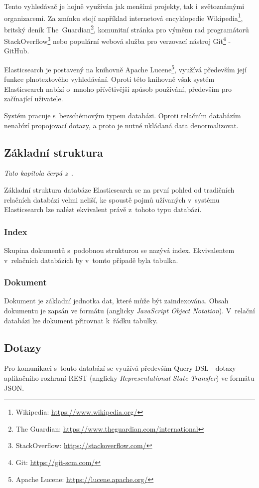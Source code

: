 Tento vyhledávač je hojně využíván jak menšími projekty, tak i~světoznámými organizacemi. Za zmínku stojí například internetová encyklopedie Wikipedia\footnote{Wikipedia: \url{https://www.wikipedia.org/}}, britský deník The~Guardian\footnote{The Guardian: \url{https://www.theguardian.com/international}}, komunitní stránka pro výměnu rad programátorů StackOverflow\footnote{StackOverflow: \url{https://stackoverflow.com/}} nebo populární webová služba pro verzovací nástroj Git\footnote{Git: \url{https://git-scm.com/}} - GitHub.

Elasticsearch je postavený na knihovně Apache Lucene\footnote{Apache Lucene: \url{https://lucene.apache.org/}}, využívá především její funkce plnotextového vyhledávání. Oproti této knihovně však systém Elasticsearch nabízí o~mnoho přívětivější způsob používání, především pro začínající uživatele. 

Systém pracuje s~bezschémovým typem databázi. Oproti relačním databázím nenabízí propojovací dotazy, a proto je nutné ukládaná data denormalizovat.

\subsection{Základní struktura}
\emph{Tato kapitola čerpá z~\cite{bib:elastic-concept}}.

Základní struktura databáze Elasticsearch se na první pohled od tradičních relačních databázi velmi neliší, ke spoustě pojmů užívaných v~systému Elasticsearch lze nalézt ekvivalent právě z~tohoto typu databází.

\subsubsection*{Index}\label{section:index}
Skupina dokumentů s~podobnou strukturou se nazývá index. Ekvivalentem v~relačních databázích by v~tomto případě byla tabulka.

\subsubsection*{Dokument}\label{section:dokument}
Dokument je základní jednotka dat, které může být zaindexována. Obsah dokumentu je zapsán ve formátu (anglicky \emph{JavaScript Object Notation}). V~relační databázi lze dokument přirovnat k~řádku tabulky.


\subsection{Dotazy}
Pro komunikaci s~touto databází se využívá především Query DSL - dotazy aplikačního rozhraní REST (anglicky \emph{Representational State Transfer}) ve formátu JSON.

